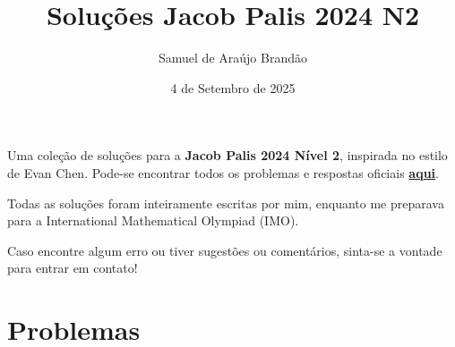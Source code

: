 \documentclass[12pt]{article}
\title{\sffamily\bfseries{Soluções Jacob Palis 2024 N2}}
\author{Samuel de Araújo Brandão}
\date{4 de Setembro de 2025}
\begin{document}
  \maketitle
  Uma coleção de soluções para a \textbf{Jacob Palis 2024 Nível 2}, inspirada no estilo de Evan Chen.
  Pode-se encontrar todos os problemas e respostas oficiais 
  \textbf{\href{https://www.obm.org.br/content/uploads/2024/06/jacob_palis_2024_provas_e_solucoes.pdf}{aqui}}.

  Todas as soluções foram inteiramente escritas por mim, enquanto me preparava para a
  International Mathematical Olympiad (IMO).

  Caso encontre algum erro ou tiver sugestões ou comentários, sinta-se a vontade 
  para entrar em contato!

  \tableofcontents

  \clearpage

  \section{\textsf{Problemas}}
\end{document}
